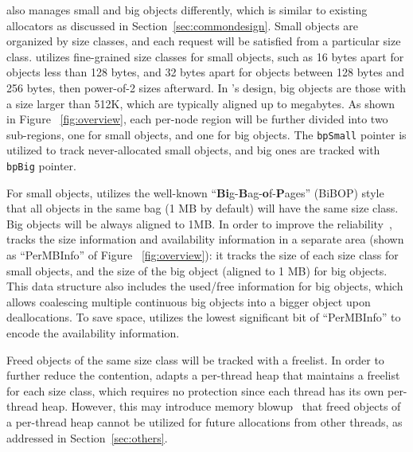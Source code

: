 
\NM{} also manages small and big objects differently, which is similar to existing allocators as discussed in Section~\ref{sec:commondesign}. Small objects are organized by size classes, and each request will be satisfied from a particular size class. \NA{} utilizes fine-grained size classes for small objects, such as 16 bytes apart for objects less than 128 bytes, and 32 bytes apart for objects between 128 bytes and 256 bytes, then power-of-2 sizes afterward. In \NM{}'s design, big objects are those with a size larger than 512K, which are typically aligned up to megabytes. As shown in Figure ~\ref{fig:overview}, each per-node region will be further divided into two sub-regions, one for small objects, and one for big objects. The \texttt{bpSmall} pointer is utilized to track never-allocated small objects, and big ones are tracked with \texttt{bpBig} pointer. 

For small objects, \NM{} utilizes the well-known  ``\textbf{Bi}g-\textbf{B}ag-\textbf{o}f-\textbf{P}ages'' (BiBOP) style that all objects in the same bag (1 MB by default) will have the same size class. Big objects will be always aligned to 1MB. In order to improve the reliability~\cite{FreeGuard, Guarder}, \NM{} tracks the size information and availability information in a separate area (shown as ``PerMBInfo'' of Figure ~\ref{fig:overview}): it tracks the size of each size class for small objects, and the size of the big object (aligned to 1 MB) for big objects. This data structure also includes the used/free information for big objects, which allows coalescing multiple continuous big objects into a bigger object upon deallocations. To save space, \NM{} utilizes the lowest significant bit of ``PerMBInfo'' to encode the availability information.

Freed objects of the same size class will be tracked with a freelist. In order to further reduce the contention, \NM{} adapts a per-thread heap that maintains a freelist for each size class, which requires no protection since each thread has its own per-thread heap. However, this may introduce memory blowup~\cite{Hoard} that freed objects of a per-thread heap cannot be utilized for future allocations from other threads, as addressed in Section~\ref{sec:others}. 

